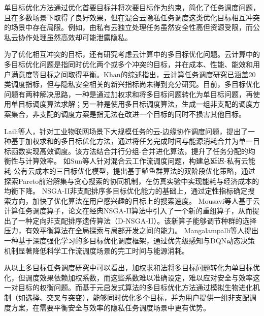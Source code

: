 单目标优化方法通过优化首要目标并将次要目标作为约束，简化了任务调度问题，且在多数场景下取得了良好效果，但在混合云隐私任务调度这类优化目标相互冲突的场景中存在局限。例如，由私有云独立处理任务虽然安全性高但资源受限，而公私云协作处理虽然高效却可能泄露隐私。

为了优化相互冲突的目标，还有研究考虑云计算中的多目标优化问题。云计算中的多目标优化问题是指同时优化两个或多个冲突的目标，并在成本、性能、能效和用户满意度等目标之间取得平衡。Khan的综述\cite{khanReviewTaskScheduling2023}指出，云计算任务调度研究已涵盖20类调度指标，但与隐私安全相关的新兴指标尚未得到充分研究。目前，多目标优化问题有两种解决思路，一种是通过加权求和将多目标问题转化为单目标问题，再使用单目标调度算法求解；另一种是使用多目标调度算法，生成一组非支配的调度方案集合，非支配的调度方案是指无法在改进一个目标的同时不损害其他目标。

Laili等人\cite{lailiParallelSchedulingLargeScale2023}，针对工业物联网场景下大规模任务的云-边缘协作调度问题，提出了一种基于加权求和的多目标优化方法，通过将任务完成时间与能源消耗合并为单一目标函数实现高效调度。该方法结合并行分组-合并进化算法，提升了任务分配的均衡性与计算效率。
如Sun等人\cite{sunEfficientEconomicalEnergysaving2023}针对混合云工作流调度问题，构建总延迟-私有云能耗-公有云成本的三目标优化模型，提出基于鲈鱼群算法的双阶段优化策略，通过探索Pareto前沿解集与贪心搜索的协同机制，在仿真实验中实现能耗与经济成本的均衡下降。
\cite{wangIntegratingWeightAssignment2018}NSGA-II非支配排序多目标优化能力的基础上，通过定性指标确定搜索方向，加快了优化算法在用户感兴趣的目标上的搜索速度。
Mousavi等人\cite{mousaviDirectedSearchNew2023}基于云计算任务调度算子，论文在经典NSGA-II算法中引入了一个新的重组算子，从而提出了一种定向非支配排序遗传算法（D-NSGA-II）。该新算子能够调节种群的选择压力，有效平衡算法在全局探索与局部开发之间的能力。
Mangalampalli等人\cite{mangalampalliMultiObjectivePrioritized2024}提出一种基于深度强化学习的多目标优化调度框架，通过优先级感知与DQN动态决策机制显著降低科学工作流调度场景的完工时间与能源消耗。


从以上多目标任务调度研究中可以看出，加权求和法将多目标问题转化为单目标优化，但调度效果依赖加权系数，而这些系数难以准确设定，难以应对安全与效率这一对目标的权衡问题。而基于元启发式算法的多目标优化方法通过模拟生物进化机制（如选择、交叉与突变），能够同时优化多个目标，并为用户提供一组非支配调度方案，在需要平衡安全与效率的隐私任务调度场景中更有优势。

